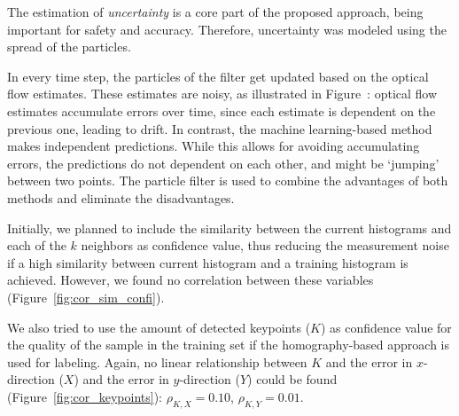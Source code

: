 \documentclass{report}
\begin{document}
The estimation of \emph{uncertainty} is a core part of the proposed
approach, being important for safety and accuracy. Therefore,
uncertainty was modeled using the spread of the particles.

In every time step, the particles of the filter get updated based on
the optical flow estimates. These estimates are noisy, as illustrated
in Figure~: optical
flow estimates accumulate errors over time, since each estimate is
dependent on the previous one, leading to drift. In contrast, the
machine learning-based method makes independent predictions. While
this allows for avoiding accumulating errors, the predictions do not
dependent on each other, and might be `jumping' between two
points. The particle filter is used to combine the advantages of both
methods and eliminate the disadvantages.

Initially, we planned to include the similarity between the current
histograms and each of the $k$ neighbors as confidence value, thus
reducing the measurement noise if a high similarity between current
histogram and a training histogram is achieved. However, we found no
correlation between these variables (Figure~\ref{fig:cor_sim_confi}).

We also tried to use the amount of detected keypoints ($K$) as
confidence value for the quality of the sample in the training set if
the homography-based approach is used for labeling. Again, no linear
relationship between $K$ and the error in $x$-direction ($X$) and the
error in $y$-direction ($Y$) could be found
(Figure~\ref{fig:cor_keypoints}): $\rho_{K, X} = 0.10$,
$\rho_{K, Y} = 0.01$.
\end{document}
